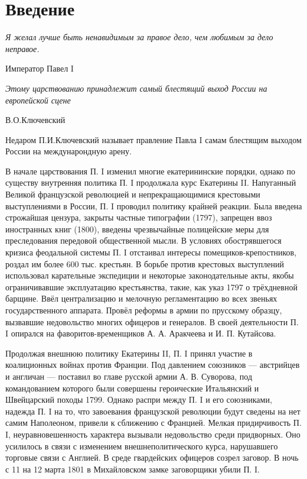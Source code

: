 \documentclass[a4paper,12pt]{diss_4}
\begin{document}

\addtocounter{page}{1}

\tableofcontents

\chapter*{Введение}


\epigraph{\textit{Я желал лучше быть ненавидимым за правое дело, чем любимым за дело неправое.}}
{Император Павел I}

\epigraph{\textit{Этому царствованию принадлежит самый блестящий выход России на европейской сцене}}
{В.О.Ключевский}
 

Недаром П.И.Ключевский называет правление Павла I самам блестящим выходом России на междунарондную арену.

В начале царствования П. I изменил многие екатерининские порядки, однако по существу внутренняя политика П. I продолжала курс Екатерины II. Напуганный Великой французской революцией и непрекращающимися крестовыми выступлениями в России, П. I проводил политику крайней реакции. Была введена строжайшая цензура, закрыты частные типографии (1797), запрещен ввоз иностранных книг (1800), введены чрезвычайные полицейские меры для преследования передовой общественной мысли. В условиях обострявшегося кризиса феодальной системы П. I отстаивал интересы помещиков-крепостников, роздал им более 600 тыс. крестьян. В борьбе против крестовых выступлений использовал карательные экспедиции и некоторые законодательные акты, якобы ограничивавшие эксплуатацию крестьянства, такие, как указ 1797 о трёхдневной барщине. Ввёл централизацию и мелочную регламентацию во всех звеньях государственного аппарата. Провёл реформы в армии по прусскому образцу, вызвавшие недовольство многих офицеров и генералов. В своей деятельности П. I опирался на фаворитов-временщиков А. А. Аракчеева и И. П. Кутайсова. 

Продолжая внешнюю политику Екатерины II, П. I принял участие в коалиционных войнах против Франции. Под давлением союзников — австрийцев и англичан — поставил во главе русской армии А. В. Суворова, под командованием которого были совершены героические Итальянский и Швейцарский походы 1799. Однако распри между П. I и его союзниками, надежда П. I на то, что завоевания французской революции будут сведены на нет самим Наполеоном, привели к сближению с Францией. Мелкая придирчивость П. I, неуравновешенность характера вызывали недовольство среди придворных. Оно усилилось в связи с изменением внешнеполитического курса, нарушавшего торговые связи с Англией. В среде гвардейских офицеров созрел заговор. В ночь с 11 на 12 марта 1801 в Михайловском замке заговорщики убили П. I. 
\end{document}
